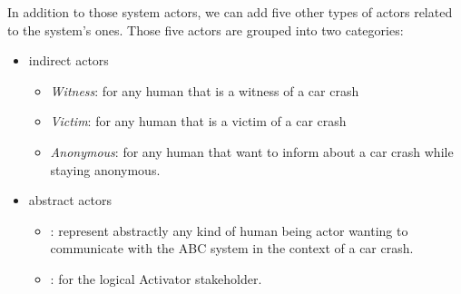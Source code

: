 In addition to those system actors, we can add five other types of actors related to the system's ones. Those five actors are grouped into two categories:
\begin{itemize}
  \item \Glspl{indirect actor}  
  \begin{itemize}
    \item \textit{Witness}: for any human that is a witness of a car crash
    \item \textit{Victim}: for any human that is a victim of a car crash
    \item \textit{Anonymous}: for any human that want to inform about a car crash while staying anonymous.
  \end{itemize}
  
  \item \Glspl{abstract actor}
	\begin{itemize}
    \item {}: represent abstractly any kind of human being actor wanting to communicate with the ABC system in the context of a car crash.
    \item {}: for the logical Activator stakeholder.
  \end{itemize}

\end{itemize}


